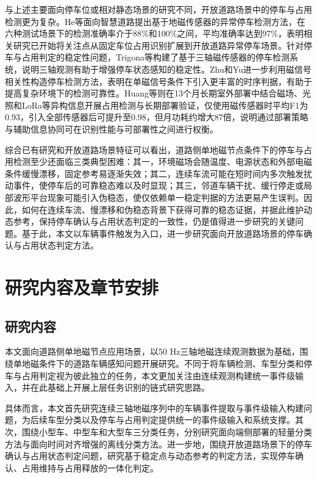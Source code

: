 \documentclass{xdupgthesis}
\begin{document}
与上述主要面向停车位或相对静态场景的研究不同，开放道路场景中的停车与占用检测更为复杂。He等\cite{R43}面向智慧道路提出基于地磁传感器的异常停车检测方法，在六种测试场景下的检测准确率介于88\%和100\%之间，平均准确率达到97\%，表明相关研究已开始将关注点从固定车位占用识别扩展到开放道路异常停车场景。针对停车与占用判定的稳定性问题，Trigona等\cite{ch4_trigona2016smartparking}构建了基于三轴磁传感器的停车检测系统，说明三轴观测有助于增强停车状态感知的稳定性。Zhu和Yu\cite{ch4_zhu2015parkingcorr}进一步利用磁信号相关性构造停车检测方法，表明在单磁信号条件下引入更丰富的时序判据，有助于提高复杂环境下的检测可靠性。Huang等\cite{ch4_huang2017easydeploy}则在13个月长期室外部署中结合磁场、光照和LoRa等异构信息开展占用检测与长期部署验证，仅使用磁传感器时平均F1为0.93，引入全部传感器后可提升至0.98，但月功耗约增大87倍，说明通过部署策略与辅助信息协同可在识别性能与可部署性之间进行权衡。

综合已有研究和开放道路场景特征可以看出，道路侧单地磁节点条件下的停车与占用检测至少还面临三类典型困难：其一，环境磁场会随温度、电源状态和外部电磁条件缓慢漂移，固定参考易逐渐失效；其二，连续车流可能在短时间内多次触发扰动事件，使停车后的可靠稳态难以及时显现；其三，邻道车辆干扰、缓行停走或局部波形平台现象可能引入伪稳态，使仅依赖单一稳定判据的方法更易产生误判。因此，如何在连续车流、慢漂移和伪稳态背景下获得可靠的稳态证据，并据此维护动态参考，保持停车确认与占用状态判定的一致性，仍是值得进一步研究的关键问题。基于此，本文以车辆事件触发为入口，进一步研究面向开放道路场景的停车确认与占用状态判定方法。


\section{研究内容及章节安排}
\label{sec:intro_content}

\subsection{研究内容}
\label{sec:research_content}

本文面向道路侧单地磁节点应用场景，以50 Hz三轴地磁连续观测数据为基础，围绕单地磁条件下的道路车辆感知问题开展研究。不同于将车辆检测、车型分类和停车与占用判定视为彼此独立的任务，本文更加关注由连续观测构建统一事件级输入，并在此基础上开展上层任务识别的链式研究思路。

具体而言，本文首先研究连续三轴地磁序列中的车辆事件提取与事件级输入构建问题，为后续车型分类以及停车与占用判定提供统一的事件级输入和系统支撑。其次，围绕小型车、中型车和大型车三分类任务，分别研究面向端侧部署的轻量分类方法与面向时间对齐增强的离线分类方法。进一步地，围绕开放道路场景下的停车确认与占用状态判定问题，研究基于稳定点与动态参考的判定方法，实现停车确认、占用维持与占用释放的一体化判定。
\end{document}
